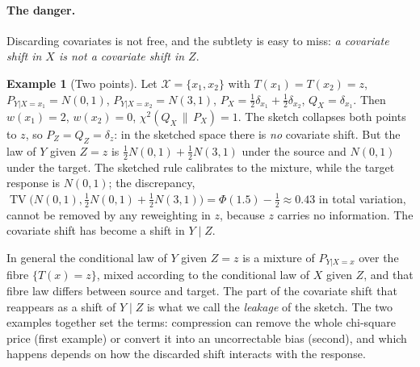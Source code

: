 \documentclass[11pt,a4paper]{article}
\newcommand{\PX}{P_X}
\newcommand{\QX}{Q_X}
\newcommand{\chisq}{\chi^2(\QX\,\|\,\PX)}
\newcommand{\TV}{\operatorname{TV}}
\theoremstyle{plain}
\theoremstyle{definition}
\newtheorem{example}[theorem]{Example}
\theoremstyle{remark}
\begin{document}
\paragraph{The danger.}
Discarding covariates is not free, and the subtlety is easy to miss: \emph{a covariate shift in $X$ is not a covariate shift in $Z$}.

\begin{example}[Two points]\label{ex:toy}
Let $\mathcal X=\{x_1,x_2\}$ with $T(x_1)=T(x_2)=z$, $P_{Y|X=x_1}=N(0,1)$, $P_{Y|X=x_2}=N(3,1)$, $\PX=\tfrac12\delta_{x_1}+\tfrac12\delta_{x_2}$, $\QX=\delta_{x_1}$. Then $w(x_1)=2$, $w(x_2)=0$, $\chisq=1$. The sketch collapses both points to $z$, so $P_Z=Q_Z=\delta_z$: in the sketched space there is \emph{no} covariate shift. But the law of $Y$ given $Z=z$ is $\tfrac12N(0,1)+\tfrac12N(3,1)$ under the source and $N(0,1)$ under the target. The sketched rule calibrates to the mixture, while the target response is $N(0,1)$; the discrepancy, $\TV\bigl(N(0,1),\tfrac12N(0,1)+\tfrac12N(3,1)\bigr)=\Phi(1.5)-\tfrac12\approx0.43$ in total variation, cannot be removed by any reweighting in $z$, because $z$ carries no information. The covariate shift has become a shift in $Y\mid Z$.
\end{example}

In general the conditional law of $Y$ given $Z=z$ is a mixture of $P_{Y|X=x}$ over the fibre $\{T(x)=z\}$, mixed according to the conditional law of $X$ given $Z$, and that fibre law differs between source and target. The part of the covariate shift that reappears as a shift of $Y\mid Z$ is what we call the \emph{leakage} of the sketch. The two examples together set the terms: compression can remove the whole chi-square price (first example) or convert it into an uncorrectable bias (second), and which happens depends on how the discarded shift interacts with the response.
\end{document}
